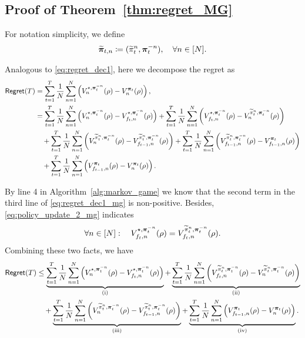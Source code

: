 \subsection{Proof of Theorem~\ref{thm:regret_MG}}\label{app:proof_thm_regret_MP}

For notation simplicity, we define
    \begin{align}\label{eq:pi_t_n}
        \widetilde{{\bm{\pi}}}_{t,n}\coloneqq (\widetilde{\pi}_t^n, {\bm{\pi}}_t^{-n}),\quad \forall n\in[N].
    \end{align}

Analogous to \eqref{eq:regret_dec1}, here we decompose the regret as
\begin{align}\label{eq:regret_dec1_mg}
    \mathsf{Regret}(T) &= \sum_{t=1}^T\frac{1}{N}\sum_{n=1}^N \left(V_{n}^{\star,{\bm{\pi}}_t^{-n}}(\rho) - V_{n}^{{\bm{\pi}}_t}(\rho)\right),\notag\\
    &= \sum_{t=1}^T \frac{1}{N}\sum_{n=1}^N \left(V_{n}^{\star,{\bm{\pi}}_t^{-n}}(\rho) - V_{f_t,n}^{\star,{\bm{\pi}}_t^{-n}}(\rho)\right) + \sum_{t=1}^T \frac{1}{N}\sum_{n=1}^N \left(V_{f_t,n}^{\star,{\bm{\pi}}_t^{-n}}(\rho) - V_{n}^{\widetilde{\pi}_t^n,{\bm{\pi}}_t^{-n}}(\rho)\right)\notag\\
    &\quad + \sum_{t=1}^T \frac{1}{N}\sum_{n=1}^N \left(V_{n}^{\widetilde{\pi}_t^n,{\bm{\pi}}_t^{-n}}(\rho) - V_{f_{t-1},n}^{\widetilde{\pi}_t^n,{\bm{\pi}}_t^{-n}}(\rho)\right)
    + \sum_{t=1}^T \frac{1}{N}\sum_{n=1}^N \left(V_{f_{t-1},n}^{\widetilde{\pi}_t^n,{\bm{\pi}}_t^{-n}}(\rho) - V_{f_{t-1},n}^{{\bm{\pi}}_t}(\rho)\right)\notag\\
    &\quad + \sum_{t=1}^T \frac{1}{N}\sum_{n=1}^N \left(V_{f_{t-1},n}^{{\bm{\pi}}_t}(\rho) - V_{n}^{{\bm{\pi}}_t}(\rho)\right).
\end{align}

By line 4 in Algorithm~\ref{alg:markov_game} we know that the second term in the third line of \eqref{eq:regret_dec1_mg} is non-positive. 
Besides, \eqref{eq:policy_update_2_mg} indicates
\begin{align}\label{eq:dagger_equation_mg}
    \forall n\in[N]:\quad V_{f_t,n}^{\star,{\bm{\pi}}_t^{-n}}(\rho) =V_{f_t,n}^{\widetilde{\pi}_t^n,{\bm{\pi}}_t^{-n}}(\rho).
\end{align}
Combining these two facts, we have 
\begin{align}\label{eq:regret_dec2_mg}
    \mathsf{Regret}(T) &\leq \underbrace{\sum_{t=1}^T \frac{1}{N}\sum_{n=1}^N \left(V_{n}^{\star,{\bm{\pi}}_t^{-n}}(\rho) - V_{f_t,n}^{\star,{\bm{\pi}}_t^{-n}}(\rho)\right)}_{\text{(i)}} 
    + \underbrace{\sum_{t=1}^T \frac{1}{N}\sum_{n=1}^N \left(V_{f_t,n}^{\widetilde{\pi}_t^n,{\bm{\pi}}_t^{-n}}(\rho) - V_{n}^{\widetilde{\pi}_t^n,{\bm{\pi}}_t^{-n}}(\rho)\right)}_{\text{(ii)}}\notag\\
    &\quad + \underbrace{\sum_{t=1}^T \frac{1}{N}\sum_{n=1}^N \left(V_{n}^{\widetilde{\pi}_t^n,{\bm{\pi}}_t^{-n}}(\rho) - V_{f_{t-1},n}^{\widetilde{\pi}_t^n,{\bm{\pi}}_t^{-n}}(\rho)\right)}_{\text{(iii)}}
    + \underbrace{\sum_{t=1}^T \frac{1}{N}\sum_{n=1}^N \left(V_{f_{t-1},n}^{{\bm{\pi}}_t}(\rho) - V_{n}^{{\bm{\pi}}_t}(\rho)\right)}_{\text{(iv)}}.
\end{align}

